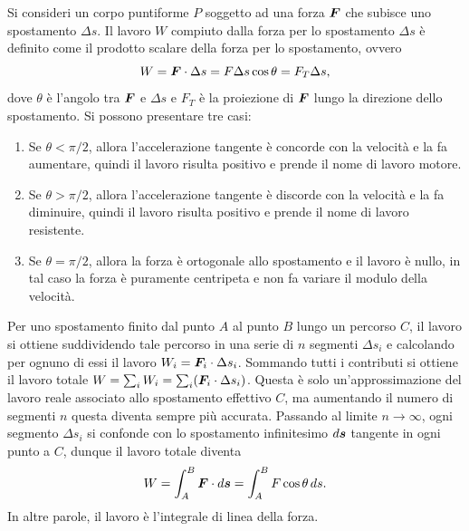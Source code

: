 Si consideri un corpo puntiforme $P$ soggetto ad una forza $\bm{F}$ che subisce uno spostamento $\Delta s$. Il lavoro $W$ compiuto dalla forza per lo spostamento $\Delta s$ è definito come il prodotto scalare della forza per lo spostamento, ovvero
\begin{equation}
\label{eq: definizione lavoro}
    W=\bm{F}\cdot\Delta s=F\Delta s\cos{\theta}=F_T\Delta s,
\end{equation}
dove $\theta$ è l'angolo tra $\bm{F}$ e $\Delta s$ e $F_T$ è la proiezione di $\bm{F}$ lungo la direzione dello spostamento. Si possono presentare tre casi:
\begin{enumerate}
    \item Se $\theta<\pi/2$, allora l'accelerazione tangente è concorde con la velocità e la fa aumentare, quindi il lavoro risulta positivo e prende il nome di lavoro motore.
    \item Se  $\theta>\pi/2$, allora l'accelerazione tangente è discorde con la velocità e la fa diminuire, quindi il lavoro risulta positivo e prende il nome di lavoro resistente.
    \item Se $\theta=\pi/2$, allora la forza è ortogonale allo spostamento e il lavoro è nullo, in tal caso la forza è puramente centripeta e non fa variare il modulo della velocità.
\end{enumerate}
Per uno spostamento finito dal punto $A$ al punto $B$ lungo un percorso $C$, il lavoro si ottiene suddividendo tale percorso in una serie di $n$ segmenti $\Delta s_i$ e calcolando per ognuno di essi il lavoro $W_i=\bm{F}_i\cdot\Delta s_i$. Sommando tutti i contributi si ottiene il lavoro totale $W=\sum_iW_i=\sum_i(\bm{F}_i\cdot\Delta s_i)$. Questa è solo un'approssimazione del lavoro reale associato allo spostamento effettivo $C$, ma aumentando il numero di segmenti $n$ questa diventa sempre più accurata. Passando al limite $n\to\infty$, ogni segmento $\Delta s_i$ si confonde con lo spostamento infinitesimo $d\bm{s}$ tangente in ogni punto a $C$, dunque il lavoro totale diventa
\begin{equation}
\label{eq: definizione lavoro spostamento finito}
    W=\int_A^B\bm{F}\cdot d\bm{s}=\int_A^BF\cos{\theta}\,ds.
\end{equation}
In altre parole, il lavoro è l'integrale di linea della forza.

